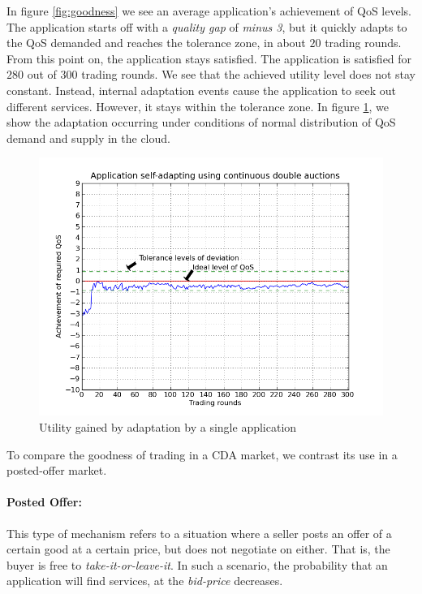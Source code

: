 \documentclass[10pt,journal,compsoc]{IEEEtran}
\begin{document}
In figure \ref{fig:goodness} we see an average application's achievement of QoS levels. The application starts off with a \textit{quality gap} of \textit{minus 3}, but it quickly adapts to the QoS demanded and reaches the tolerance zone, in about $20$ trading rounds. From this point on, the application stays satisfied. The application is satisfied for $280$ out of $300$ trading rounds. We see that the achieved utility level does not stay constant. Instead, internal adaptation events cause the application to seek out different services. However, it stays within the tolerance zone. In figure \ref{fig:goodness_cda}, we show the adaptation occurring  under conditions of normal distribution of QoS demand and supply in the cloud. 
 \begin{figure}[h]
 	\centering
    \includegraphics[scale=0.45]{graphs/Single_App_Self_Adaptation_Across_Rounds_With_QA_Change.png}
    \caption{Utility gained by adaptation by a single application \label{fig:goodness_cda}}
\end{figure}	 

To compare the goodness of trading in a CDA market, we contrast its use in a posted-offer market.
\paragraph{Posted Offer:} This type of mechanism refers to a situation where a seller posts an offer of a certain good at a certain price, but does not negotiate on either. That is, the buyer is free to \textit{take-it-or-leave-it}.  In such a scenario, the probability that an application will find services, at the \textit{bid-price} decreases. 
\end{document}
